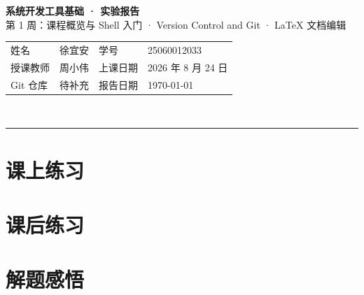 \documentclass[12pt,a4paper,fontset=fandol]{ctexart}
\makeatletter
\newcommand{\weeknum}{第 1 周}
\newcommand{\weektheme}{课程概览与 Shell 入门 · Version Control and Git · LaTeX 文档编辑}
\newcommand{\classdate}{2026 年 8 月 24 日}
\newcommand{\makereporttitle}{%
  \begin{center}
    {\LARGE\bfseries 系统开发工具基础 · 实验报告}\\[0.4em]
    {\large \weeknum：\weektheme}\\[0.7em]
    {\small
    \begin{tabular}{@{}ll@{\hspace{3em}}ll@{}}
      姓\quad 名 & 徐宜安 & 学\quad 号 & 25060012033 \\
      授课教师 & 周小伟 & 上课日期 & \classdate \\
      Git 仓库 & 待补充 & 报告日期 & \today \\
    \end{tabular}}\\[0.7em]
    \rule{\textwidth}{0.8pt}
  \end{center}
}
\makeatother
\begin{document}
\makereporttitle

\section{课上练习}

\section{课后练习}

\section{解题感悟}
\end{document}
